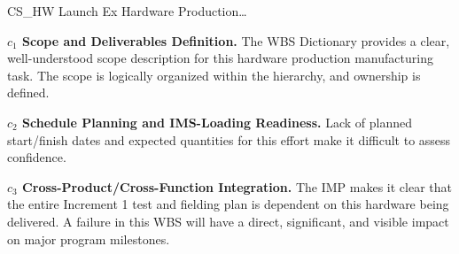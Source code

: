 \begin{frame}{CS\_HW Launch Ex Hardware Production\ldots{}}
\begin{minipage}{0.90\textwidth}
\raggedright
\fontsize{8}{9.5}\selectfont
\textbf{\(c_1\) Scope and Deliverables Definition.}
The WBS Dictionary provides a clear, well-understood scope description for this hardware production manufacturing task. The scope is logically organized within the hierarchy, and ownership is defined.\par\vspace{0.6em}
\textbf{\(c_2\) Schedule Planning and IMS-Loading Readiness.}
Lack of planned start/finish dates and expected quantities for this effort make it difficult to assess confidence.\par\vspace{0.6em}
\textbf{\(c_3\) Cross-Product/Cross-Function Integration.}
The IMP makes it clear that the entire Increment 1 test and fielding plan is dependent on this hardware being delivered. A failure in this WBS will have a direct, significant, and visible impact on major program milestones.\par\vspace{0.6em}
\end{minipage}
\end{frame}

\endinput
